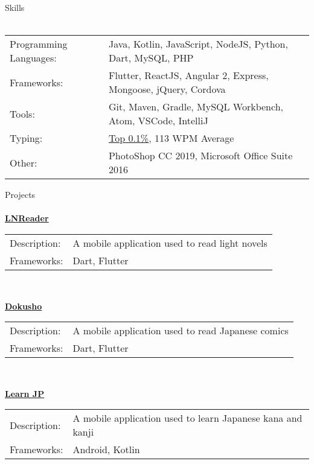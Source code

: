 \documentclass[a4paper]{article}
\newcommand{\lineunder} {
    \vspace*{-8pt} \\
    \hspace*{-18pt} \hrulefill \\
}
\newcommand{\header} [1] {
    {\hspace*{-18pt}\vspace*{6pt} {#1}}
    \vspace*{-6pt} \lineunder
}
\begin{document}
\header{Skills}
\vspace{2mm}
\begin{tabular}{ l l }
	Programming Languages: & Java, Kotlin, JavaScript, NodeJS, Python, Dart, MySQL, PHP    \\
	Frameworks:            & Flutter, ReactJS, Angular 2, Express, Mongoose, jQuery, Cordova
	\vspace{0.5mm}\\
	Tools:                 & Git, Maven, Gradle, MySQL Workbench, Atom, VSCode, IntelliJ
	\vspace{0.5mm}\\
	Typing:                & \href{https://data.typeracer.com/misc/badge?user=tsedlar}{\ul{Top 0.1\%}}, 113 WPM Average
	\vspace{0.5mm}\\
	Other:                 & PhotoShop CC 2019, Microsoft Office Suite 2016  \\
\end{tabular}
\vspace{2mm}

\header{Projects}
{\textbf{\href{https://sedlar.me/lnreader}{\ul{LNReader}}}}\\
\vspace*{1mm}
\begin{tabular}{ l l }
    Description: & A mobile application used to read light novels\\
    Frameworks:  & Dart, Flutter
\end{tabular}\\
\vspace*{2mm}

{\textbf{\href{https://github.com/TSedlar/dokusho}{\ul{Dokusho}}}}\\
\vspace*{1mm}
\begin{tabular}{ l l }
    Description: & A mobile application used to read Japanese comics\\
    Frameworks:  & Dart, Flutter
\end{tabular}\\
\vspace*{2mm}

{\textbf{\href{https://itunes.apple.com/us/app/learn-jp/id1447060691}{\ul{Learn JP}}}}\\
\vspace*{1mm}
\begin{tabular}{ l l }
    Description: & A mobile application used to learn Japanese kana and kanji\\
    Frameworks:  & Android, Kotlin
\end{tabular}\\
\vspace*{2mm}
\end{document}
